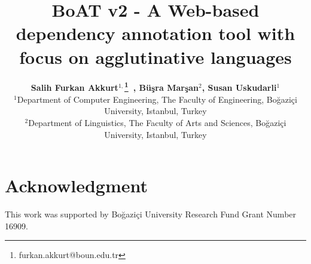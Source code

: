 \documentclass{elektr}
\title{BoAT v2 - A Web-based dependency annotation tool with focus on agglutinative languages}
\author[AKKURT et al.]{
\textbf{Salih Furkan Akkurt$^{1,}$\thanks{furkan.akkurt@boun.edu.tr}~, Büşra Marşan$^{2}$, Susan Uskudarli$^{1}$}\\
$^{1}$Department of Computer Engineering, The Faculty of Engineering, Boğaziçi University, Istanbul, Turkey\\
$^{2}$Department of Linguistics, The Faculty of Arts and Sciences, Boğaziçi University, Istanbul, Turkey
\\ [1.8em]

\rec{.202}
\acc{.202}
\finv{..202}
}
\begin{document}
\maketitle












\section*{Acknowledgment}
This work was supported by Boğaziçi University Research Fund Grant Number 16909.




\newpage
\appendix

\end{document}
